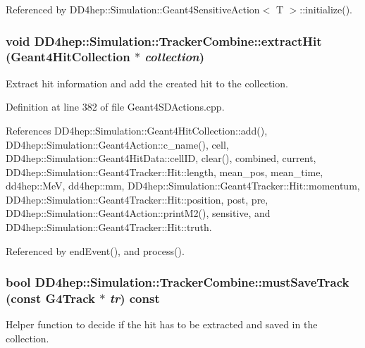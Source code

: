 Referenced by DD4hep::Simulation::Geant4SensitiveAction$<$ T $>$::initialize().\hypertarget{struct_d_d4hep_1_1_simulation_1_1_tracker_combine_a75803adf3212ecca99d2b6fbcd53899f}{
\subsubsection[{extractHit}]{\setlength{\rightskip}{0pt plus 5cm}void DD4hep::Simulation::TrackerCombine::extractHit ({\bf Geant4HitCollection} $\ast$ {\em collection})}}
\label{struct_d_d4hep_1_1_simulation_1_1_tracker_combine_a75803adf3212ecca99d2b6fbcd53899f}


Extract hit information and add the created hit to the collection. 

Definition at line 382 of file Geant4SDActions.cpp.

References DD4hep::Simulation::Geant4HitCollection::add(), DD4hep::Simulation::Geant4Action::c\_\-name(), cell, DD4hep::Simulation::Geant4HitData::cellID, clear(), combined, current, DD4hep::Simulation::Geant4Tracker::Hit::length, mean\_\-pos, mean\_\-time, dd4hep::MeV, dd4hep::mm, DD4hep::Simulation::Geant4Tracker::Hit::momentum, DD4hep::Simulation::Geant4Tracker::Hit::position, post, pre, DD4hep::Simulation::Geant4Action::printM2(), sensitive, and DD4hep::Simulation::Geant4Tracker::Hit::truth.

Referenced by endEvent(), and process().\hypertarget{struct_d_d4hep_1_1_simulation_1_1_tracker_combine_a063b82a781184cc0fbf21c0876a6acd6}{
\subsubsection[{mustSaveTrack}]{\setlength{\rightskip}{0pt plus 5cm}bool DD4hep::Simulation::TrackerCombine::mustSaveTrack (const G4Track $\ast$ {\em tr}) const}}
\label{struct_d_d4hep_1_1_simulation_1_1_tracker_combine_a063b82a781184cc0fbf21c0876a6acd6}


Helper function to decide if the hit has to be extracted and saved in the collection. 

